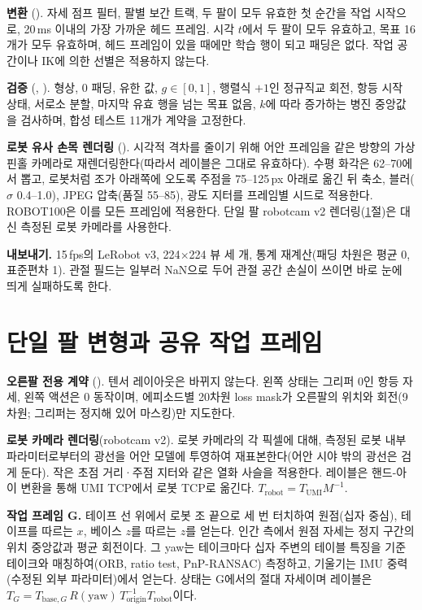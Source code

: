 \documentclass[conference,10pt]{IEEEtran}
\begin{document}
\textbf{변환} (). 자세 점프 필터, 팔별 보간 트랙, 두 팔이 모두 유효한 첫 순간을 작업 시작으로, 20\,ms 이내의 가장
가까운 헤드 프레임. 시각 $t$에서 두 팔이 모두 유효하고, 목표 16개가 모두 유효하며, 헤드 프레임이 있을 때에만 학습 행이 되고 패딩은
없다. 작업 공간이나 IK에 의한 선별은 적용하지 않는다.

\textbf{검증} (, ). 형상, 0 패딩, 유한 값, $g\in[0,1]$, 행렬식 $+1$인 정규직교 회전, 항등 시작 상태,
서로소 분할, 마지막 유효 행을 넘는 목표 없음, $k$에 따라 증가하는 병진 중앙값을 검사하며, 합성 테스트 11개가 계약을 고정한다.

\textbf{로봇 유사 손목 렌더링} (). 시각적 격차를 줄이기 위해 어안 프레임을 같은 방향의
가상 핀홀 카메라로 재렌더링한다(따라서 레이블은 그대로 유효하다). 수평 화각은 62--70\textdegree{}에서 뽑고, 로봇처럼 조가 아래쪽에
오도록 주점을 75--125\,px 아래로 옮긴 뒤 축소, 블러($\sigma$ 0.4--1.0), JPEG 압축(품질 55--85), 광도 지터를 프레임별 시드로
적용한다. ROBOT100은 이를 모든 프레임에 적용한다. 단일 팔 robotcam v2 렌더링(\ref{sec:hra}절)은 대신 측정된 로봇 카메라를 사용한다.

\textbf{내보내기.} 15\,fps의 LeRobot v3, 224$\times$224 뷰 세 개, 통계 재계산(패딩 차원은 평균 0, 표준편차 1). 관절 필드는 일부러
NaN으로 두어 관절 공간 손실이 쓰이면 바로 눈에 띄게 실패하도록 한다.

\section{단일 팔 변형과 공유 작업 프레임}\label{sec:hra}
\textbf{오른팔 전용 계약} (). 텐서 레이아웃은 바뀌지 않는다. 왼쪽 상태는 그리퍼 0인 항등 자세, 왼쪽 액션은 0
동작이며, 에피소드별 20차원 loss mask가 오른팔의 위치와 회전(9차원; 그리퍼는 정지해 있어 마스킹)만 지도한다.

\textbf{로봇 카메라 렌더링}(robotcam v2). 로봇 카메라의 각 픽셀에 대해, 측정된 로봇 내부 파라미터로부터의 광선을 어안 모델에
투영하여 재표본한다(어안 시야 밖의 광선은 검게 둔다). 작은 초점 거리·주점 지터와 같은 열화 사슬을 적용한다. 레이블은 핸드-아이
변환을 통해 UMI TCP에서 로봇 TCP로 옮긴다. $T_\text{robot}=T_\text{UMI}M^{-1}$.

\textbf{작업 프레임 G.} 테이프 선 위에서 로봇 조 끝으로 세 번 터치하여 원점(십자 중심), 테이프를 따르는 $x$, 베이스 $z$를 따르는
$z$를 얻는다. 인간 측에서 원점 자세는 정지 구간의 위치 중앙값과 평균 회전이다. 그 yaw는 테이크마다 십자 주변의 테이블 특징을 기준
테이크와 매칭하여(ORB, ratio test, PnP-RANSAC) 측정하고, 기울기는 IMU 중력(수정된 외부 파라미터)에서 얻는다. 상태는 G에서의 절대
자세이며 레이블은 $T_G = T_{\text{base},G}\,R(\text{yaw})\,T_\text{origin}^{-1}T_\text{robot}$이다.
\end{document}
